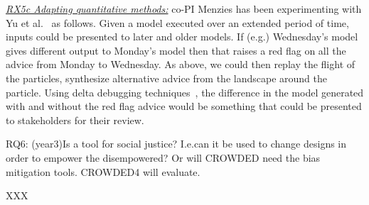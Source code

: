 \underline{\em RX5c Adapting quantitative methods:}
co-PI Menzies
has been experimenting with Yu et al.~\cite{yu2019improving}  as follows.  Given a model  executed over an extended period of time,   inputs could be presented to later and older models.
If (e.g.) Wednesday's model
gives different output to Monday's model then that raises a red flag on all the advice from Monday to
Wednesday. As above, we could then replay the flight of the particles, synthesize alternative advice from the landscape around the particle. 
Using delta debugging techniques~\cite{Zeller99}, the difference in the model generated with and without the red flag advice would be something that could be presented to stakeholders for their review. 
 

\item RQ6: (year3)Is  a tool for social justice? I.e.can it be used to change designs in order to empower the disempowered?  Or will CROWDED need the bias mitigation tools. CROWDED4 will evaluate.

XXX
